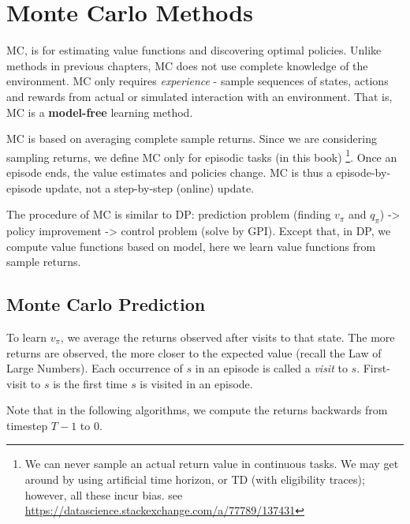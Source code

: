 \documentclass[sutton_barto_notes.tex]{subfiles}
\begin{document}
\newpage
\section{Monte Carlo Methods}

MC, is for estimating value functions and discovering optimal policies. Unlike methods in previous chapters, MC does not use complete knowledge of the environment. MC only requires \textit{experience} - sample sequences of states, actions and rewards from actual or simulated interaction with an environment. That is, MC is a \textbf{model-free} learning method.

MC is based on averaging complete sample returns. Since we are considering sampling returns, we define MC only for episodic tasks (in this book) \footnote{We can never sample an actual return value in continuous tasks. We may get around by using artificial time horizon, or TD (with eligibility traces); however, all these incur bias. see \url{https://datascience.stackexchange.com/a/77789/137431}}. Once an episode ends, the value estimates and policies change. MC is thus a episode-by-episode update, not a step-by-step (online) update.

The procedure of MC is similar to DP: prediction problem (finding $v_\pi$ and $q_\pi$) -> policy improvement -> control problem (solve by GPI). Except that, in DP, we compute value functions based on model, here we learn value functions from sample returns.

\subsection{Monte Carlo Prediction}

To learn $v_\pi$, we average the returns observed after visits to that state. The more returns are observed, the more closer to the expected value (recall the Law of Large Numbers). Each occurrence of $s$ in an episode is called a \textit{visit} to $s$. First-visit to $s$ is the first time $s$ is visited in an episode.

Note that in the following algorithms, we compute the returns backwards from timestep $T-1$ to $0$.
\end{document}
